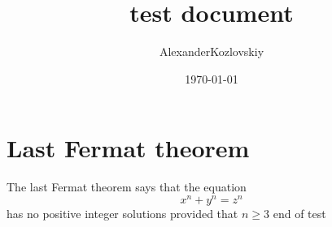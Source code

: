 \documentclass{article}
\title{test document}
\author{AlexanderKozlovskiy}
\date{\today}
\begin{document}
\section{Last Fermat theorem}

The last Fermat theorem says that the equation 
\[ 
x^n+y^n=z^n 
\] has no positive integer solutions provided that \( n\ge 3 \) end of test
\end{document}
